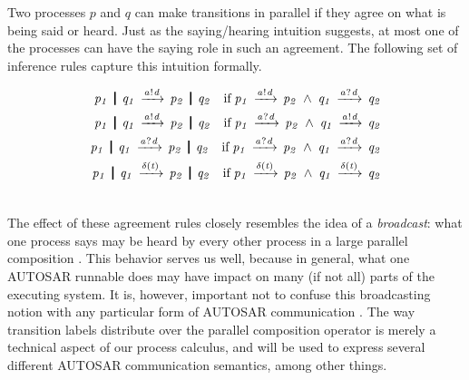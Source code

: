 \documentclass[10pt,conference]{IEEEtran}
\begin{document}
Two processes $p$ and $q$ can make transitions in parallel if they agree on what is being said or heard. Just as the saying/hearing intuition suggests, at most one of the processes can have the saying role in such an agreement. The following set of inference rules capture this intuition formally.
{
\renewcommand{\Prule}[2]{#1 \quad \Pif\; #2\\}
\renewcommand{\Tstep}[3]{#1 \red{#2} #3}
\renewcommand\Pcomma{\;\wedge\;}

\begin{eqnarray}  \CombRed  \notag \end{eqnarray}
}


The effect of these agreement rules closely resembles the idea of a \emph{broadcast}: what one process says may be heard by every other process in a large parallel composition \cite{prasad:cbs}. This behavior serves us well, because in general, what one AUTOSAR runnable does may have impact on many (if not all) parts of the executing system. It is, however, important not to confuse this broadcasting notion with any particular form of AUTOSAR communication \cite[ch.~4.2]{AR:SWC}. The way transition labels distribute over the parallel composition operator is merely a technical aspect of our process calculus, and will be used to express several different AUTOSAR communication semantics, among other things.
\end{document}
